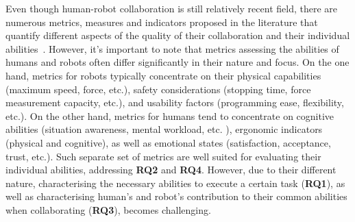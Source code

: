 Even though human-robot collaboration is still relatively recent field, there are numerous metrics, measures and indicators proposed in the literature that quantify different aspects of the quality of their collaboration and their individual abilities~\cite{CORONADO2022collab_quality}.
However, it's important to note that metrics assessing the abilities of humans and robots often differ significantly in their nature and focus. On the one hand, metrics for robots typically concentrate on their physical capabilities (maximum speed, force, etc.), safety considerations (stopping time, force measurement capacity, etc.), and usability factors (programming ease, flexibility, etc.). On the other hand, metrics for humans tend to concentrate on cognitive abilities (situation awareness, mental workload, etc. ), ergonomic indicators (physical and cognitive), as well as emotional states (satisfaction, acceptance, trust, etc.). 
Such separate set of metrics are well suited for evaluating their individual abilities, addressing \textbf{RQ2} and \textbf{RQ4}. However, due to their different nature, characterising the necessary abilities to execute a certain task (\textbf{RQ1}), as well as characterising human's and robot's contribution to their common abilities when collaborating (\textbf{RQ3}), becomes challenging. 



